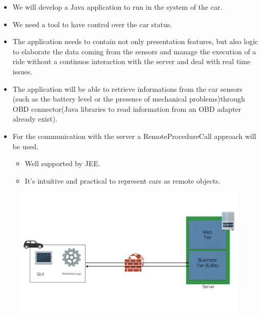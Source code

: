 \documentclass[]{article}
\providecommand{\tightlist}{%
  \setlength{\itemsep}{0pt}\setlength{\parskip}{0pt}}
\begin{document}
\begin{itemize}
\item
  We will develop a Java application to run in the system of the car.
\item
  We need a tool to have control over the car status.
\item
  The application needs to contain not only presentation features, but
  also logic to elaborate the data coming from the sensors and manage
  the execution of a ride without a continuos interaction with the
  server and deal with real time issues.
\item
  The application will be able to retrieve informations from the car
  sensors (such as the battery level or the presence of mechanical
  problems)through OBD connector(Java libraries to read information from
  an OBD adapter already exist).
\item
  For the communication with the server a RemoteProcedureCall approach
  will be used.

  \begin{itemize}
  \tightlist
  \item
    Well supported by JEE.
  \item
    It's intuitive and practical to represent cars as remote objects.
  \end{itemize}
\end{itemize}

\begin{figure}
\centering
\includegraphics[width=1.00000\textwidth,height=1.00000\textwidth]{./images/carAppArch.png}
\caption{}\label{id}
\end{figure}
\end{document}
